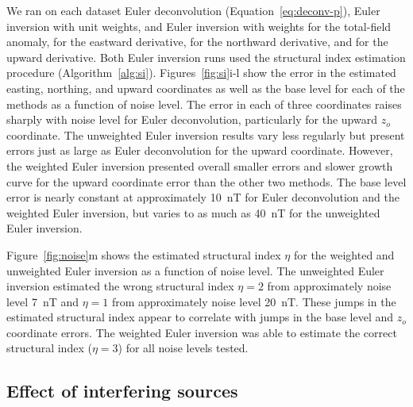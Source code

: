 We ran on each dataset Euler deconvolution (Equation~\ref{eq:deconv-p}), Euler inversion with unit weights, and Euler inversion with weights \SynNoiseWeightsF{} for the total-field anomaly, \SynNoiseWeightsE{} for the eastward derivative, \SynNoiseWeightsN{} for the northward derivative, and \SynNoiseWeightsU{} for the upward derivative.
Both Euler inversion runs used the structural index estimation procedure (Algorithm~\ref{alg:si}).
Figures~\ref{fig:si}i-l show the error in the estimated easting, northing, and upward coordinates as well as the base level for each of the methods as a function of noise level.
The error in each of three coordinates raises sharply with noise level for Euler deconvolution, particularly for the upward $z_o$ coordinate. 
The unweighted Euler inversion results vary less regularly but present errors just as large as Euler deconvolution for the upward coordinate.
However, the weighted Euler inversion presented overall smaller errors and slower growth curve for the upward coordinate error than the other two methods.
The base level error is nearly constant at approximately \qty{10}{\nano\tesla} for Euler deconvolution and the weighted Euler inversion, but varies to as much as \qty{40}{\nano\tesla} for the unweighted Euler inversion.

Figure~\ref{fig:noise}m shows the estimated structural index $\eta$ for the weighted and unweighted Euler inversion as a function of noise level. 
The unweighted Euler inversion estimated the wrong structural index $\eta=2$ from approximately noise level \qty{7}{\nano\tesla} and $\eta=1$ from approximately noise level \qty{20}{\nano\tesla}.
These jumps in the estimated structural index appear to correlate with jumps in the base level and $z_o$ coordinate errors.
The weighted Euler inversion was able to estimate the correct structural index ($\eta=3$) for all noise levels tested.


\subsection{Effect of interfering sources}
\label{sec:interf}

